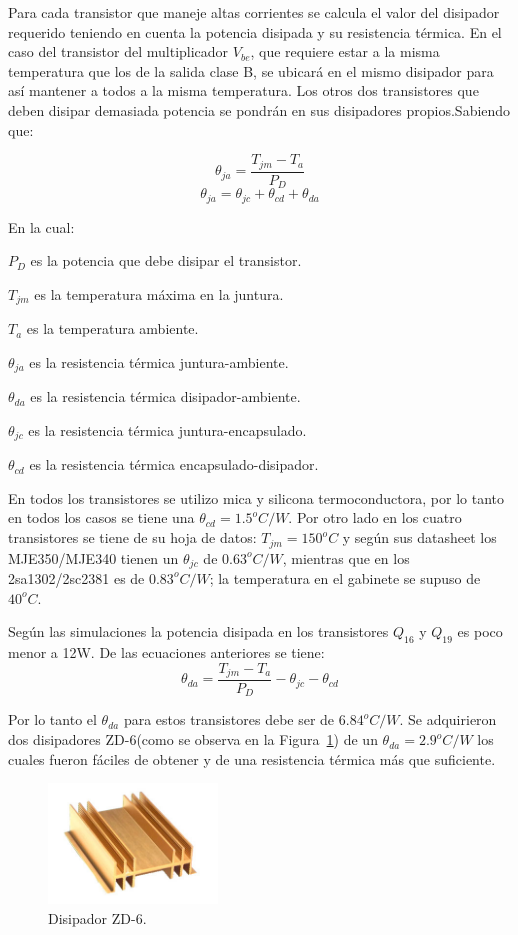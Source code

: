 Para cada transistor que maneje altas corrientes se calcula el valor del disipador requerido teniendo en cuenta la potencia disipada y su resistencia térmica. En el caso del transistor del multiplicador $V_{be}$, que requiere estar a la misma temperatura que los de la salida clase B, se ubicará en el mismo disipador para así mantener a todos a la misma temperatura. Los otros dos transistores que deben disipar demasiada potencia se pondrán en sus disipadores propios.Sabiendo que:

$$
   \theta_{ja}=\dfrac{T_{jm}-T_a}{P_D}
$$
$$
	\theta_{ja}=\theta_{jc}+\theta_{cd}+\theta_{da}
$$

En la cual:
\begin{list}{ }
\item $P_D$  es la potencia que debe disipar el transistor.
\item $T_{jm}$ es la temperatura máxima en la juntura.
\item  $T_a$ es la temperatura ambiente.
\item  $\theta_{ja}$ es la resistencia térmica juntura-ambiente.
\item  $\theta_{da}$ es la resistencia térmica disipador-ambiente.
\item  $\theta_{jc}$ es la resistencia térmica juntura-encapsulado.
\item  $\theta_{cd}$ es la resistencia térmica encapsulado-disipador.
\end{list}
En todos los transistores se utilizo mica y silicona termoconductora, por lo tanto en todos los casos se tiene una $\theta_{cd}=1.5^oC/W$.
Por otro lado en los cuatro transistores se tiene de su hoja de datos: $T_{jm}=150^oC$ y según sus datasheet los MJE350/MJE340 tienen un $\theta_{jc}$ de $0.63^oC/W$, mientras que en los 2sa1302/2sc2381 es de $0.83^oC/W$; la temperatura en el gabinete se supuso de $40^oC$.

Según las simulaciones la potencia disipada en los transistores $Q_{16}$ y $Q_{19}$ es poco menor a 12W. De las ecuaciones anteriores se tiene:
$$
	\theta_{da}=\dfrac{T_{jm}-T_a}{P_D} - \theta_{jc}-\theta_{cd}
$$

Por lo tanto el $\theta_{da}$ para estos transistores debe ser de $6.84^oC/W$. Se adquirieron dos disipadores ZD-6(como se observa en la Figura~\ref{zd6}) de un  $\theta_{da}=2.9^oC/W$ los cuales fueron fáciles de obtener y de una resistencia térmica más que suficiente.

\begin{figure}[H]
\centerline{
\includegraphics[width=0.4\textwidth]{img/zd-6.jpg}}
\caption{Disipador ZD-6.}
\label{zd6} 
\end{figure}

